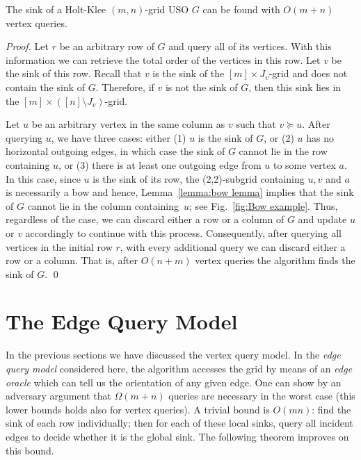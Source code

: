 \documentclass[runningheads,a4paper]{llncs}
\begin{document}
\begin{theorem}\label{theorem:Holt-Klee algorithm}
The sink of a Holt-Klee $(m,n)$-grid USO $G$ can be found with \linebreak$O(m+n)$ vertex queries.
\end{theorem}
\begin{proof}
Let $r$ be an arbitrary row of $G$ and query all of its vertices. With this information we can retrieve the total order of the vertices in this row. Let $v$ be the sink of this row.
Recall that $v$ is the sink of the $[m]\times J_v$-grid and does not contain the sink of $G$.
Therefore, if $v$ is not the sink of $G$, then this sink lies in the $[m] \times ([n]\setminus J_v)$-grid. 

Let $u$ be an arbitrary vertex in the same column as $v$ such that $v\succeq u$. After querying $u$, we have three cases:
either (1) $u$ is the sink of $G$, or (2)
 $u$ has no horizontal outgoing edges, in which case the sink of $G$ cannot lie in the row containing $u$, or (3) there is at least one outgoing edge from $u$ to some vertex $a$. 
In this case, since $u$ is the sink of its row, the (2,2)-subgrid containing $u,v$ and $a$ is necessarily a bow and hence, Lemma~\ref{lemma:bow lemma} implies that the sink of $G$ cannot lie in the column containing~$u$; see Fig.~\ref{fig:Bow example}.
Thus, regardless of the case, we can discard either a row or a column of $G$ and update  $u$ or $v$ accordingly to continue with this process.
Consequently, after querying all vertices in the initial row $r$, with every additional query we can discard either a row or a column. That is, after $O(n+ m)$ vertex queries the algorithm finds the sink of $G$.
\qed
\end{proof}

\section{The Edge Query Model}
\label{section:The edge query model}

In the previous sections we have discussed the vertex query model.
In the \emph{edge query model} considered here, the algorithm accesses the
grid by means of an \emph{edge oracle} which can tell us
the orientation of any given edge.
One can show by an adversary argument that $\Omega(m+n)$ queries are necessary in the worst case (this lower bounds holds also for vertex queries).
A trivial bound is $O(mn)$: find the sink of each row individually; then
for each of these local sinks, query all incident edges to decide whether it
is the global sink.
The following theorem improves on this bound.
\end{document}
